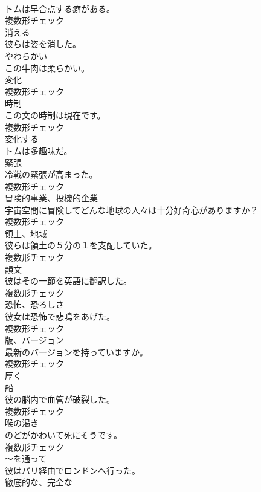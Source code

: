 \documentclass[8pt]{extreport}
\begin{document}
\begin{CJK}{UTF8}{min}
\\	トムは早合点する癖がある。	
\\	複数形チェック
\\	[動詞]	消える	
\\	彼らは姿を消した。	
\\	[形容詞]	やわらかい	
\\	この牛肉は柔らかい。	
\\	[名詞]	変化	
\\	複数形チェック
\\	[名詞]	時制	
\\	この文の時制は現在です。	
\\	複数形チェック
\\	[動詞]	変化する	
\\	トムは多趣味だ。	
\\	[名詞]	緊張	
\\	冷戦の緊張が高まった。	
\\	複数形チェック
\\	[名詞]	冒険的事業、投機的企業	
\\	宇宙空間に冒険してどんな地球の人々は十分好奇心がありますか？	
\\	複数形チェック
\\	[名詞]	領土、地域	
\\	彼らは領土の５分の１を支配していた。	
\\	複数形チェック
\\	[名詞]	韻文	
\\	彼はその一節を英語に翻訳した。	
\\	複数形チェック
\\	[名詞]	恐怖、恐ろしさ	
\\	彼女は恐怖で悲鳴をあげた。	
\\	複数形チェック
\\	[名詞]	版、バージョン	
\\	最新のバージョンを持っていますか。	
\\	複数形チェック
\\	[副詞]	厚く	
\\	[名詞]	船	
\\	彼の脳内で血管が破裂した。	
\\	複数形チェック
\\	[名詞]	喉の渇き	
\\	のどがかわいて死にそうです。	
\\	複数形チェック
\\	[前置詞]	〜を通って	
\\	彼はパリ経由でロンドンへ行った。	
\\	[形容詞]	徹底的な、完全な	

\end{CJK}
\end{document}
